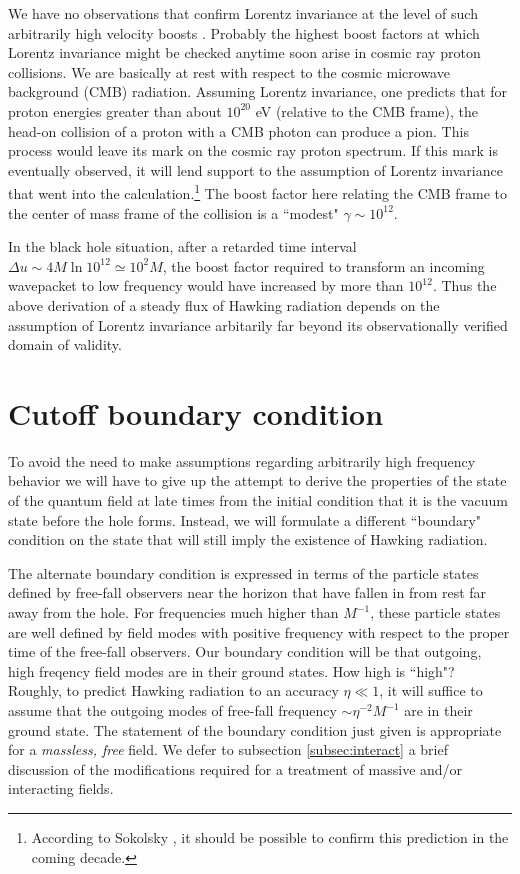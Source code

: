 \documentclass[12pt]{article}
\begin{document}
We have no observations that confirm Lorentz invariance
at the level of such arbitrarily high velocity boosts
\cite{Blok,NielPic,Will}.
Probably the highest boost factors at which Lorentz invariance
might be checked anytime soon arise in cosmic ray proton
collisions. We are basically at rest with respect to the cosmic
microwave background (CMB) radiation. Assuming Lorentz
invariance, one predicts that for proton energies greater
than about $10^{20}$ eV (relative to the CMB frame),
the head-on collision of a proton with a CMB photon can
produce a pion. This process would leave its mark on the
cosmic ray proton spectrum. If this mark is eventually
observed, it will lend support to the assumption of
Lorentz invariance that went into the
calculation.\footnote{According to Sokolsky \cite{Sokol}, it
should be possible to confirm this prediction in the coming decade.}
The boost factor here relating the CMB frame to the center of mass
frame of the collision is a ``modest" $\gamma\sim 10^{12}$.

In the black hole situation, after a retarded time interval
$\Delta u\sim 4M \ln 10^{12}\simeq 10^2 M$,
the boost factor required to transform
an incoming wavepacket to low frequency would have increased
by more than $10^{12}$. Thus the above derivation of a
steady flux of Hawking radiation depends on the assumption
of Lorentz invariance arbitarily far beyond its observationally
verified domain of validity.
\section{Cutoff boundary condition}
\label{sec:4}

To avoid the need to make assumptions regarding arbitrarily
high frequency behavior we will have to give up the attempt
to derive the properties of the state of the quantum field
at late times from the initial condition that it is the
vacuum state before the hole forms. Instead, we will formulate
a different ``boundary" condition on the state that will
still imply the existence of Hawking radiation.

The alternate boundary condition is expressed in terms of
the particle states defined by free-fall observers near the
horizon that have fallen in from rest far away from the
hole. For frequencies much higher than $M^{-1}$, these particle
states are well defined by field modes with positive
frequency with respect to the proper time of the free-fall
observers. Our boundary condition will be that outgoing,
high freqency field modes are in their ground states. How
high is ``high"? Roughly, to predict Hawking radiation
to an accuracy $\eta\ll 1$, it will suffice to assume that the
outgoing modes of free-fall frequency
$\sim \eta^{-2}M^{-1}$ are in their ground state.
The statement of the boundary condition just given is
appropriate for a {\it massless, free} field. We defer to
subsection
\ref{subsec:interact} a brief discussion of the modifications
required for a treatment of massive and/or interacting fields.
\end{document}
